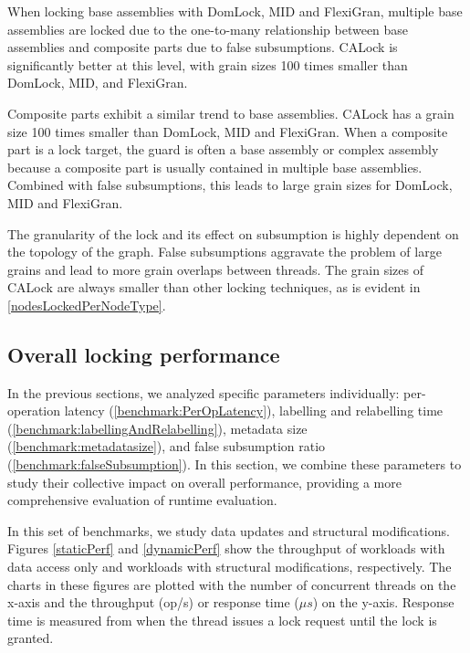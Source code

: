 When locking base assemblies with DomLock, MID and FlexiGran, multiple base assemblies are locked due to the one-to-many relationship between base assemblies and composite parts due to false subsumptions. CALock is significantly better at this level, with grain sizes 100 times smaller than DomLock, MID, and FlexiGran.

Composite parts exhibit a similar trend to base assemblies. CALock has a grain size 100 times smaller than DomLock, MID and FlexiGran. When a composite part is a lock target, the guard is often a base assembly or complex assembly because a composite part is usually contained in multiple base assemblies. Combined with false subsumptions, this leads to large grain sizes for DomLock, MID and FlexiGran.

The granularity of the lock and its effect on subsumption is highly dependent on the topology of the graph. 
False subsumptions aggravate the problem of large grains and lead to more grain overlaps between threads. 
The grain sizes of CALock are always smaller than other locking techniques, as is evident in \cref{nodesLockedPerNodeType}.


\subsection{Overall locking performance}

In the previous sections, we analyzed specific parameters individually: per-operation latency (\cref{benchmark:PerOpLatency}), labelling and relabelling time (\cref{benchmark:labellingAndRelabelling}), metadata size (\cref{benchmark:metadatasize}), and false subsumption ratio (\cref{benchmark:falseSubsumption}). In this section, we combine these parameters to study their collective impact on overall performance, providing a more comprehensive evaluation of runtime evaluation. 

In this set of benchmarks, we study data updates and structural modifications. 
Figures \cref{staticPerf} and \cref{dynamicPerf} show the throughput of workloads with data access only and workloads with structural modifications, respectively. 
The charts in these figures are plotted with the number of concurrent threads on the x-axis and the throughput (op/s) or response time ($\mu s$) on the y-axis. 
Response time is measured from when the thread issues a lock request until the lock is granted.


